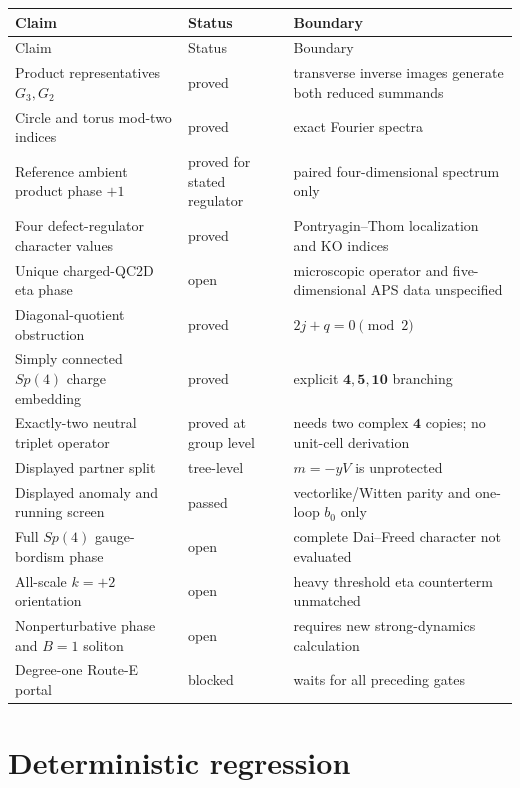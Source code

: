 \documentclass[11pt]{article}
\theoremstyle{definition}
\theoremstyle{remark}
\newcommand{\status}[1]{\textcolor{blue!60!black}{\textsf{#1}}}
\begin{document}
\begin{longtable}{@{}L{0.44\textwidth}L{0.17\textwidth}L{0.30\textwidth}@{}}
\toprule
Claim & Status & Boundary\\
\midrule
\endfirsthead
\toprule
Claim & Status & Boundary\\
\midrule
\endhead
Product representatives \(G_3,G_2\) & \status{proved} & transverse inverse images generate both reduced summands\\
Circle and torus mod-two indices & \status{proved} & exact Fourier spectra\\
Reference ambient product phase \(+1\) & \status{proved for stated regulator} & paired four-dimensional spectrum only\\
Four defect-regulator character values & \status{proved} & Pontryagin--Thom localization and KO indices\\
Unique charged-QC2D eta phase & \status{open} & microscopic operator and five-dimensional APS data unspecified\\
Diagonal-quotient obstruction & \status{proved} & \(2j+q=0\pmod2\)\\
Simply connected \(Sp(4)\) charge embedding & \status{proved} & explicit \(\bm4,\bm5,\bm{10}\) branching\\
Exactly-two neutral triplet operator & \status{proved at group level} & needs two complex \(\bm4\) copies; no unit-cell derivation\\
Displayed partner split & \status{tree-level} & \(m=-yV\) is unprotected\\
Displayed anomaly and running screen & \status{passed} & vectorlike/Witten parity and one-loop \(b_0\) only\\
Full \(Sp(4)\) gauge-bordism phase & \status{open} & complete Dai--Freed character not evaluated\\
All-scale \(k=+2\) orientation & \status{open} & heavy threshold eta counterterm unmatched\\
Nonperturbative phase and \(B=1\) soliton & \status{open} & requires new strong-dynamics calculation\\
Degree-one Route-E portal & \status{blocked} & waits for all preceding gates\\
\bottomrule
\end{longtable}

\section{Deterministic regression}
\end{document}
